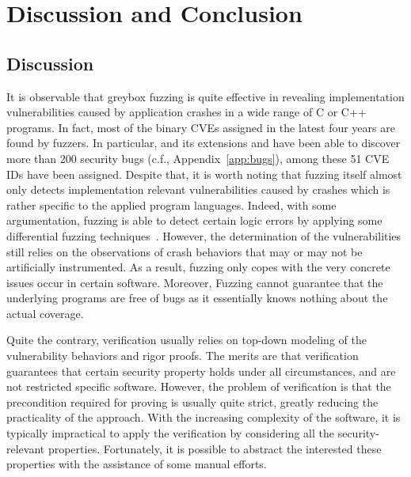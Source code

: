 
\chapter{Discussion and Conclusion} \label{ch:conclusion}


\section{Discussion}\label{sec:discuss}

It is observable that greybox fuzzing is quite effective in revealing implementation vulnerabilities caused by application crashes in a wide range of C or C++ programs. In fact, most of the binary CVEs assigned in the latest four years are found by fuzzers. In particular, \FOT and its extensions \dFOT and \mtfuzz have been able to discover more than 200 security bugs (c.f., Appendix~\ref{app:bugs}), among these 51 CVE IDs have been assigned. Despite that, it is worth noting that fuzzing itself almost only detects implementation relevant vulnerabilities caused by crashes which is rather specific to the applied program languages. Indeed, with some argumentation, fuzzing is able to detect certain logic errors by applying some differential fuzzing techniques~\cite{nezha}. However, the determination of the vulnerabilities still relies on the observations of crash behaviors that may or may not be artificially instrumented. As a result, fuzzing only copes with the very concrete issues occur in certain software. Moreover, Fuzzing cannot guarantee that the underlying programs are free of bugs as it essentially knows nothing about the actual coverage.

Quite the contrary, verification usually relies on top-down modeling of the vulnerability behaviors and rigor proofs. The merits are that verification guarantees that certain security property holds under all circumstances, and are not restricted specific software. However, the problem of verification is that the precondition required for proving is usually quite strict, greatly reducing the practicality of the approach. With the increasing complexity of the software, it is typically impractical to apply the verification by considering all the security-relevant properties. Fortunately, it is possible to abstract the interested these properties with the assistance of some manual efforts.

